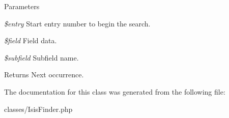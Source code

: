 \begin{DoxyParams}{Parameters}
\item[{\em \$entry}]Start entry number to begin the search.\item[{\em \$field}]Field data.\item[{\em \$subfield}]Subfield name.\end{DoxyParams}
\begin{DoxyReturn}{Returns}
Next occurrence. 
\end{DoxyReturn}


The documentation for this class was generated from the following file:\begin{DoxyCompactItemize}
\item 
classes/IsisFinder.php\end{DoxyCompactItemize}
